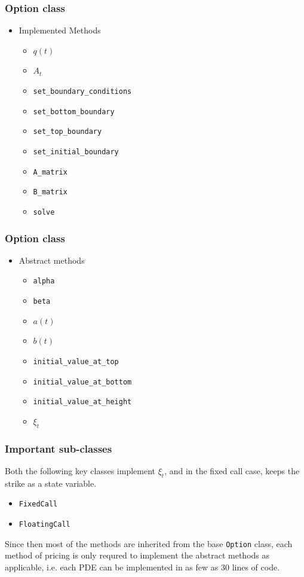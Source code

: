\documentclass{beamer}
\begin{document}
  \begin{frame}
    \frametitle{Option class}
    \begin{itemize}
      \item Implemented Methods
      \begin{itemize}
        \item \(q(t)\)
        \item \(A_t\)
        \item \texttt{set\_boundary\_conditions}
        \item \texttt{set\_bottom\_boundary}
        \item \texttt{set\_top\_boundary}
        \item \texttt{set\_initial\_boundary}
        \item \texttt{A\_matrix}
        \item \texttt{B\_matrix}
        \item \texttt{solve}
      \end{itemize}
    \end{itemize}
  \end{frame}
  
  \begin{frame}
    \frametitle{Option class}
    \begin{itemize}
      \item Abstract methods
      \begin{itemize}
        \item \texttt{alpha}
        \item \texttt{beta}
        \item \( a(t) \)
        \item \( b(t) \)
        \item \texttt{initial\_value\_at\_top}
        \item \texttt{initial\_value\_at\_bottom}
        \item \texttt{initial\_value\_at\_height}
        \item \(\xi_t\)
      \end{itemize}
    \end{itemize}
  \end{frame}

  \begin{frame}
    \frametitle{Important sub-classes}
    Both the following key classes implement \(\xi_t\), and in the fixed call case, keeps the strike as a state variable.
    \begin{itemize}
      \item \texttt{FixedCall}
      \item \texttt{FloatingCall}
    \end{itemize}
    Since then most of the methods are inherited from the base \texttt{Option} class, each method of pricing is only requred to implement the abstract methods as applicable, i.e. each PDE can be implemented in as few as 30 lines of code.
  \end{frame}
\end{document}
